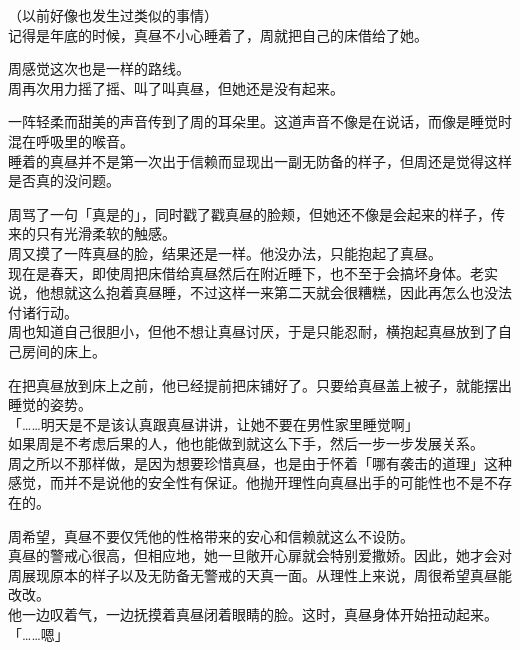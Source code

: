 （以前好像也发生过类似的事情）\\

记得是年底的时候，真昼不小心睡着了，周就把自己的床借给了她。

周感觉这次也是一样的路线。\\

周再次用力摇了摇、叫了叫真昼，但她还是没有起来。

一阵轻柔而甜美的声音传到了周的耳朵里。这道声音不像是在说话，而像是睡觉时混在呼吸里的喉音。\\

睡着的真昼并不是第一次出于信赖而显现出一副无防备的样子，但周还是觉得这样是否真的没问题。

周骂了一句「真是的」，同时戳了戳真昼的脸颊，但她还不像是会起来的样子，传来的只有光滑柔软的触感。\\

周又摸了一阵真昼的脸，结果还是一样。他没办法，只能抱起了真昼。\\

现在是春天，即使周把床借给真昼然后在附近睡下，也不至于会搞坏身体。老实说，他想就这么抱着真昼睡，不过这样一来第二天就会很糟糕，因此再怎么也没法付诸行动。\\

周也知道自己很胆小，但他不想让真昼讨厌，于是只能忍耐，横抱起真昼放到了自己房间的床上。

在把真昼放到床上之前，他已经提前把床铺好了。只要给真昼盖上被子，就能摆出睡觉的姿势。\\

「……明天是不是该认真跟真昼讲讲，让她不要在男性家里睡觉啊」\\

如果周是不考虑后果的人，他也能做到就这么下手，然后一步一步发展关系。\\

周之所以不那样做，是因为想要珍惜真昼，也是由于怀着「哪有袭击的道理」这种感觉，而并不是说他的安全性有保证。他抛开理性向真昼出手的可能性也不是不存在的。

周希望，真昼不要仅凭他的性格带来的安心和信赖就这么不设防。\\

真昼的警戒心很高，但相应地，她一旦敞开心扉就会特别爱撒娇。因此，她才会对周展现原本的样子以及无防备无警戒的天真一面。从理性上来说，周很希望真昼能改改。\\

他一边叹着气，一边抚摸着真昼闭着眼睛的脸。这时，真昼身体开始扭动起来。\\

「……嗯」\\

